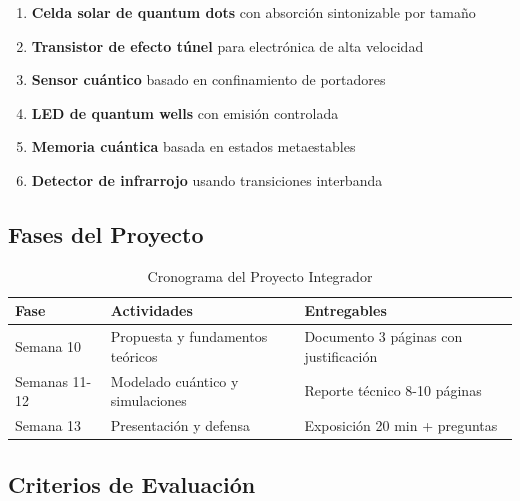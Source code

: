 \begin{tecnologiabox}
\begin{tecnologiabox}
\begin{tecnologiabox}
\begin{enumerate}
	\item \textbf{Celda solar de quantum dots} con absorción sintonizable por tamaño
	\item \textbf{Transistor de efecto túnel} para electrónica de alta velocidad
	\item \textbf{Sensor cuántico} basado en confinamiento de portadores
	\item \textbf{LED de quantum wells} con emisión controlada
	\item \textbf{Memoria cuántica} basada en estados metaestables
	\item \textbf{Detector de infrarrojo} usando transiciones interbanda
\end{enumerate}

\subsection{Fases del Proyecto}

\begin{table}[h]
	\centering
	\caption{Cronograma del Proyecto Integrador}
	\begin{tabular}{|C{2cm}|L{5cm}|L{5cm}|}
		\hline
		\textbf{Fase} & \textbf{Actividades} & \textbf{Entregables} \\
		\hline
		Semana 10 & Propuesta y fundamentos teóricos & Documento 3 páginas con justificación \\
		\hline
		Semanas 11-12 & Modelado cuántico y simulaciones & Reporte técnico 8-10 páginas \\
		\hline
		Semana 13 & Presentación y defensa & Exposición 20 min + preguntas \\
		\hline
	\end{tabular}
\end{table}

\subsection{Criterios de Evaluación}


\end{tecnologiabox}
\end{tecnologiabox}
\end{tecnologiabox}
